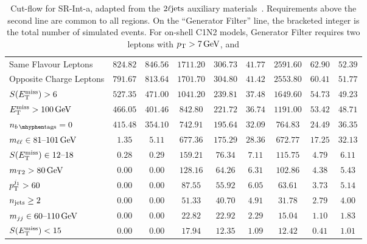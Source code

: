 \begin{sidewaystable}[tp]
{\begin{tabular}{lcccccccc}
Same Flavour Leptons                                       & $824.82$ & $846.56$ & $1711.20$ & $306.73$ & $41.77$ & $2591.60$ & $62.90$ & $52.39$ \\
Opposite Charge Leptons                                   & $791.67$ & $813.64$ & $1701.70$ & $304.80$ & $41.42$ & $2553.80$ & $60.41$ & $51.77$ \\
$\metsig > 6$                                               & $527.35$ & $471.00$ & $1041.20$ & $239.81$ & $37.48$ & $1649.60$ & $54.73$ & $49.23$ \\
$\met > 100\,\eV[G]$                                           & $466.05$ & $401.46$ & $842.80$ & $221.72$ & $36.74$ & $1191.00$ & $53.42$ & $48.71$ \\
\hline
$\nbtag = 0$                                             & $415.48$ & $354.10$ & $742.91$ & $195.64$ & $32.09$ & $764.83$ & $24.49$ & $36.35$ \\
$\mll \in 81\text{--}101\,\eV[G]$                            & $1.35$ & $5.11$ & $677.36$ & $175.29$ & $28.36$ & $672.77$ & $17.25$ & $32.13$ \\
$\metsig \in 12\text{--}18$                               & $0.28$ & $0.29$ & $159.21$ & $76.34$ & $7.11$ & $115.75$ & $4.79$ & $6.11$ \\
$\mttwo > 80\,\eV[G]$                                        & $0.00$ & $0.00$ & $128.16$ & $64.26$ & $6.31$ & $102.86$ & $4.38$ & $5.43$ \\
$\pt^{j_1} > 60$                       & $0.00$ & $0.00$ & $87.55$ & $55.92$ & $6.05$ & $63.61$ & $3.73$ & $5.14$ \\
$\njet \geq 2$                               & $0.00$ & $0.00$ & $51.33$ & $40.70$ & $4.91$ & $31.78$ & $2.79$ & $4.00$ \\
$\mjj \in 60\text{--}110\,\eV[G]$                            & $0.00$ & $0.00$ & $22.82$ & $22.92$ & $2.29$ & $15.04$ & $1.10$ & $1.83$ \\
$\metsig < 15$                                            & $0.00$ & $0.00$ & $17.94$ & $12.35$ & $1.09$ & $12.42$ & $0.41$ & $1.01$ \\
\end{tabular}
}
\caption[
Cut-flow for SR-Int-a
]{%
Cut-flow for SR-Int-a,
adapted from the $\twoljets$ auxiliary materials~\cite{hepdata.116034}.
Requirements above the second line are common to all regions.
On the ``Generator Filter'' line, the bracketed integer is the total number of
simulated events.
For on-shell C1N2 models, Generator Filter requires
two leptons with $\pt > 7\,\eV[G]$, and
}
\end{sidewaystable}

